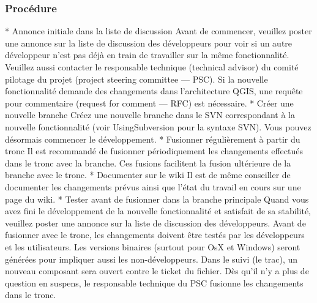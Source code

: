 \subsubsection{Procédure}
 * Annonce initiale dans la liste de discussion
 Avant de commencer, veuillez poster une annonce sur la liste de discussion des développeurs pour voir si un autre développeur n'est pas déjà en train de travailler sur la même fonctionnalité. Veuillez aussi contacter le responsable technique (technical advisor) du comité pilotage du projet (project steering committee --- PSC). Si la nouvelle fonctionnalité demande des changements dans l'architecture QGIS, une requête pour commentaire (request for comment --- RFC) est nécessaire.
 * Créer une nouvelle branche
Créez une nouvelle branche dans le SVN correspondant à la nouvelle fonctionnalité (voir UsingSubversion pour la syntaxe SVN). Vous pouvez désormais commencer le développement. 
 * Fusionner régulièrement à partir du tronc
Il est recommandé de fusionner périodiquement les changements effectués dans le tronc avec la branche. Ces fusions facilitent la fusion ultérieure de la branche avec le tronc.%
 * Documenter sur le wiki
Il est de même conseiller de documenter les changements prévus ainsi que l'état du travail en cours sur une page du wiki.
 * Tester avant de fusionner dans la branche principale
Quand vous avez fini le développement de la nouvelle fonctionnalité et satisfait de sa stabilité, veuillez poster une annonce sur la liste de discussion des développeurs. Avant de fusionner avec le tronc, les changements doivent être testés par les développeurs et les utilisateurs. Les versions binaires (surtout pour OsX et Windows) seront générées pour impliquer aussi les non-développeurs. Dans le suivi (le trac), un nouveau composant sera ouvert contre le ticket du fichier. Dès qu'il n'y a plus  de question en suspens, le responsable technique du PSC fusionne les changements dans le tronc.

